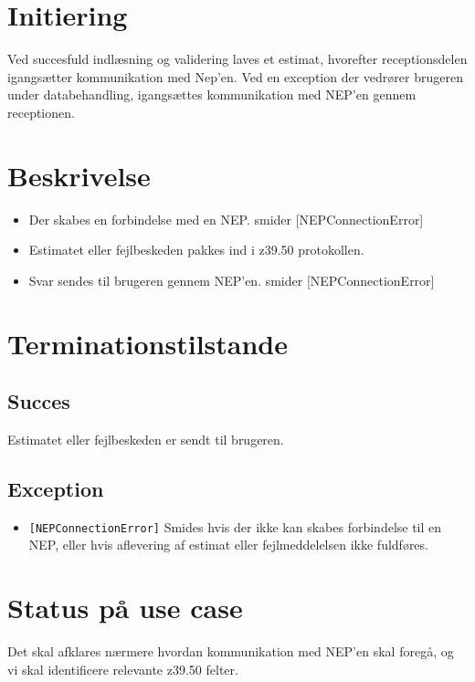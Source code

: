 \documentclass{article}
\begin{document}
\section{Initiering}
Ved succesfuld indlæsning og validering laves et estimat, hvorefter receptionsdelen igangsætter kommunikation med Nep'en.
Ved en exception der vedrører brugeren under databehandling, igangsættes kommunikation med NEP'en gennem receptionen.  

\section{Beskrivelse}


\begin{itemize}
\item Der skabes en forbindelse med en NEP.
  smider [NEPConnectionError]
\item Estimatet eller fejlbeskeden pakkes ind i z39.50 protokollen. 
\item Svar sendes til brugeren gennem NEP'en.
  smider [NEPConnectionError]
\end{itemize}

\section{Terminationstilstande}

\subsection{Succes}
Estimatet eller fejlbeskeden er sendt til brugeren.

\subsection{Exception}

\begin{itemize}
\item \texttt{[NEPConnectionError]}
  Smides hvis der ikke kan skabes forbindelse til en NEP, eller hvis aflevering af estimat eller fejlmeddelelsen ikke fuldføres.
\end{itemize}

\section{Status på use case}
Det skal afklares nærmere hvordan kommunikation med NEP'en skal foregå, og vi skal identificere relevante z39.50 felter.
\end{document}
